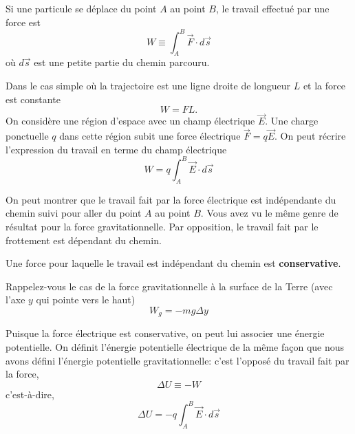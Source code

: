 \clearpage


\begin{fondamentalbox}
Si une particule se déplace du point $A$ au point $B$, le travail
effectué par une force est
\[
  W \equiv \int_A^B \vec{F} \cdot d\vec{s}
\]
où $d\vec{s}$ est une petite partie du chemin parcouru. 
\end{fondamentalbox}
Dans le cas simple où la trajectoire est une ligne droite de longueur $L$ et la
force est constante
\[
  W = FL.
\]
On considère une région d'espace avec un champ électrique $\vec{E}$. Une charge
ponctuelle $q$ dans cette région subit une force électrique $\vec{F} =
q\vec{E}$. 
On peut récrire l'expression du travail en terme du champ électrique
\[
  W = q \int_A^B \vec{E}\cdot d\vec{s}
\]
\begin{center}
\end{center}



On peut montrer que le travail fait par la force électrique est indépendante du
chemin suivi pour aller du point $A$ au point $B$. Vous avez vu le même genre
de résultat pour la force gravitationnelle. Par opposition, le travail fait par
le frottement est dépendant du chemin.

Une force pour laquelle le travail est indépendant du chemin est
\textbf{conservative}.

Rappelez-vous le cas de la force gravitationnelle à la surface de la Terre
(avec l'axe $y$ qui pointe vers le haut)
$$W_g = -mg \Delta y$$



Puisque la force électrique est conservative, on peut lui associer une énergie
potentielle. On définit l'énergie potentielle électrique de la même façon que
nous avons défini l'énergie potentielle gravitationnelle: c'est l'opposé du
travail fait par la force,
$$\Delta U \equiv -W$$
c'est-à-dire,
\[
  \Delta U = - q\int_A^B \vec{E} \cdot d\vec{s}
\]


